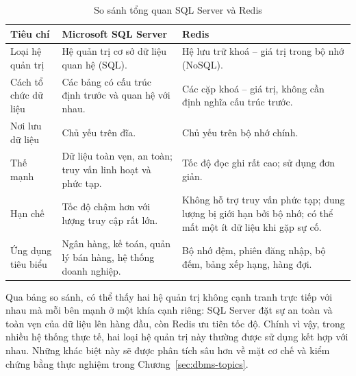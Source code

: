 \begin{table}[H]
\centering
\small
\renewcommand{\arraystretch}{1.3}
\begin{tabularx}{\textwidth}{|>{\raggedright\arraybackslash}p{3cm}|>{\raggedright\arraybackslash}X|>{\raggedright\arraybackslash}X|}
\hline
\textbf{Tiêu chí} & \textbf{Microsoft SQL Server} & \textbf{Redis} \\ \hline
Loại hệ quản trị & Hệ quản trị cơ sở dữ liệu quan hệ (SQL). & Hệ lưu trữ khoá -- giá trị trong bộ nhớ (NoSQL). \\ \hline
Cách tổ chức dữ liệu & Các bảng có cấu trúc định trước và quan hệ với nhau. & Các cặp khoá -- giá trị, không cần định nghĩa cấu trúc trước. \\ \hline
Nơi lưu dữ liệu & Chủ yếu trên đĩa. & Chủ yếu trên bộ nhớ chính. \\ \hline
Thế mạnh & Dữ liệu toàn vẹn, an toàn; truy vấn linh hoạt và phức tạp. & Tốc độ đọc ghi rất cao; sử dụng đơn giản. \\ \hline
Hạn chế & Tốc độ chậm hơn với lượng truy cập rất lớn. & Không hỗ trợ truy vấn phức tạp; dung lượng bị giới hạn bởi bộ nhớ; có thể mất một ít dữ liệu khi gặp sự cố. \\ \hline
Ứng dụng tiêu biểu & Ngân hàng, kế toán, quản lý bán hàng, hệ thống doanh nghiệp. & Bộ nhớ đệm, phiên đăng nhập, bộ đếm, bảng xếp hạng, hàng đợi. \\ \hline
\end{tabularx}
\caption{So sánh tổng quan SQL Server và Redis}
\label{tab:overview-comparison}
\end{table}

Qua bảng so sánh, có thể thấy hai hệ quản trị không cạnh tranh trực tiếp với nhau mà mỗi bên mạnh ở một khía cạnh riêng: SQL Server đặt sự an toàn và toàn vẹn của dữ liệu lên hàng đầu, còn Redis ưu tiên tốc độ. Chính vì vậy, trong nhiều hệ thống thực tế, hai loại hệ quản trị này thường được sử dụng kết hợp với nhau. Những khác biệt này sẽ được phân tích sâu hơn về mặt cơ chế và kiểm chứng bằng thực nghiệm trong Chương~\ref{sec:dbms-topics}.
